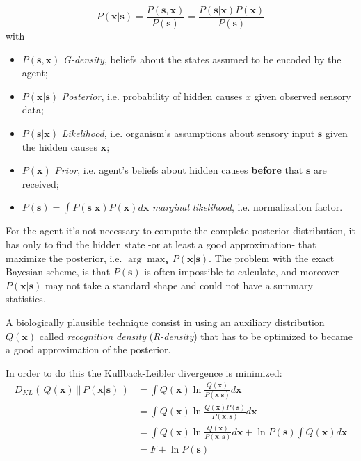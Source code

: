 \documentclass[a4paper, 10pt]{article}
\begin{document}
\begin{equation}
P(\mathbf{x}|\mathbf{s}) = \frac{P(\mathbf{s},\mathbf{x})}{P(\mathbf{s})} = \frac{P(\mathbf{s}|\mathbf{x})P(\mathbf{x})}{P(\mathbf{s})}
\end{equation}
with
\begin{itemize}

\item $P(\mathbf{s},\mathbf{x})$ \emph{G-density}, beliefs about the states assumed to be encoded by the agent;

\item $P(\mathbf{x}|\mathbf{s})$ \emph{Posterior}, i.e. probability of hidden causes $x$ given observed sensory data; 

\item $P(\mathbf{s}|\mathbf{x})$ \emph{Likelihood}, i.e. organism's assumptions about sensory input $\mathbf{s}$ given the hidden causes $\mathbf{x}$;

\item $P(\mathbf x)$ \emph{Prior}, i.e. agent's beliefs about hidden causes \textbf{before} that $\mathbf s$ are received;

\item $P(\mathbf s)=\int P(\mathbf s|\mathbf x)P(\mathbf x) d\mathbf x $ \emph{marginal likelihood}, i.e. normalization factor.

\end{itemize}

For the agent it's not necessary to compute the complete posterior distribution, it has only to find the hidden state -or at least a good approximation- that maximize the posterior, i.e. $\arg \max_{\mathbf{x}} P(\mathbf x|\mathbf s)$.
The problem with the exact Bayesian scheme, is that $P(\mathbf s)$ is often impossible to calculate, and moreover $P(\mathbf x|\mathbf s)$ may not take a standard shape and could not have a summary statistics. 

A biologically plausible technique consist in using an auxiliary distribution $Q(\mathbf x)$ called \emph{recognition density} (\emph{R-density}) that has to be optimized to became a good approximation of the posterior.  

In order to do this the Kullback-Leibler  divergence is minimized:
\begin{equation}
\begin{split}
D_{KL} (\, Q(\mathbf x)\, ||\, P(\mathbf x|\mathbf s)\, ) & = \int Q(\mathbf x) \ln \frac{Q(\mathbf x)}{P(\mathbf x|\mathbf s)} d\mathbf x \\
                                  & = \int Q(\mathbf x) \ln \frac{Q(\mathbf x)P(\mathbf s)}{P(\mathbf x,\mathbf s)} d\mathbf x \\
                                  & = \int Q(\mathbf x) \ln \frac{Q(\mathbf x)}{P(\mathbf x,\mathbf s)} d\mathbf x + \ln P(\mathbf s) \int Q(\mathbf x) d\mathbf x \\
                                  & = F + \ln P(\mathbf s)
\end{split}
\end{equation}
\end{document}
